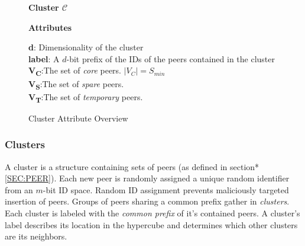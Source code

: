 \documentclass[12pt]{report}
\theoremstyle{plain}
\begin{document}
		
			    \begin{figure}[h]
					\onehalfspacing
					\begin{lrbox}{\mybox}
					\hspace*{-0.8cm}
					\begin{minipage}{0.91\columnwidth}
						\linespread{1.5}
						\vspace{0.2cm}
				   		\textbf{\large{Cluster $\mathcal{C}$}}
						\begin{addmargin}[1em]{0em}
							\textbf{Attributes}
							\begin{addmargin}[1em]{0em}
								\textbf{d}: Dimensionality of the cluster\\
								\textbf{label}: A $d$-bit prefix of the IDs of the peers contained in the cluster\\
								\textbf{V\textsubscript{C}}:The set of \textit{core} peers. $|V_C| = S_{min}$\\
								\textbf{V\textsubscript{S}}:The set of \textit{spare} peers.\\
								\textbf{V\textsubscript{T}}:The set of \textit{temporary} peers.\\
								
							\end{addmargin}
						\end{addmargin}
					\end{minipage}
					\end{lrbox}
					\framebox[\columnwidth]{\hspace*{15pt}\usebox\mybox\par}
					\caption{Cluster Attribute Overview}
				    \label{fig:CLUSTERDEF}
			    \end{figure}

		\subsubsection*{Clusters}
			A cluster is a structure containing sets of peers (as defined in section* \ref{SEC:PEER}).
			Each new peer is randomly assigned a unique random identifier from an $m$-bit ID space. 
			Random ID assignment prevents maliciously targeted insertion of peers.
			Groups of peers sharing a common prefix gather in \textit{clusters}.
			Each cluster is labeled with the \textit{common prefix} of it's contained peers.
			A cluster's label describes its location in the hypercube and determines which other clusters are its neighbors. 

	   
			
\end{document}

